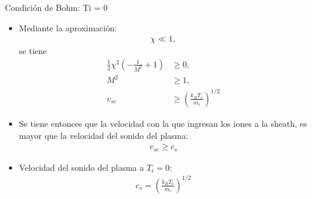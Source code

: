 \documentclass[11pt]{beamer}
\begin{document}
    \begin{frame}{Condici\'on de Bohm: Ti = 0}
        \fontsize{8pt}{10}\selectfont
        
        \begin{itemize}
            \item Mediante la aproximación:
            \begin{align*}
              \chi \ll 1,
            \end{align*}
           se tiene
           \begin{align*}
           \frac{1}{2}\chi^2\left(-\frac{1}{M^2}+1\right) &\geq 0,\\
              M^2 &\geq 1, \\
              v_{se} &\geq \left(\frac{k_BT_e}{m_i}\right)^{1/2}
            \end{align*}
            \item Se tiene entonces que la velocidad con la que ingresan los iones a la sheath, es mayor que la velocidad del sonido del plasma:
            \begin{align*}
                v_{se} \geq c_s
            \end{align*}
            \item Velocidad del sonido del plasma a $T_i = 0$:
            \begin{align*}
                c_s = \left(\frac{k_BT_e}{m_i}\right)^{1/2}
            \end{align*} 
        \end{itemize}
        
        \end{frame}
        
\end{document}
